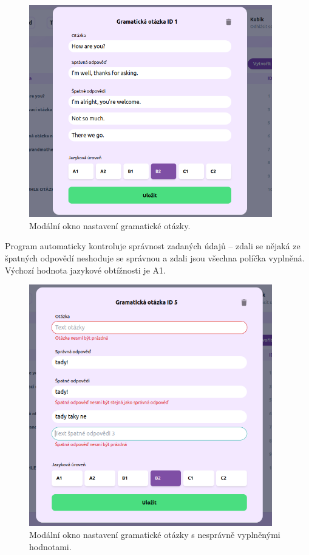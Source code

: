\begin{figure}[H]
    \centering
    \includegraphics[width=400px]{images/01design/question.png}
    \caption{Modální okno nastavení gramatické otázky.}
\end{figure}

Program automaticky kontroluje správnost zadaných údajů -- zdali se nějaká ze špatných odpovědí neshoduje se správnou a zdali jsou všechna políčka vyplněná. Výchozí hodnota jazykové obtížnosti je A1.

\begin{figure}[H]
    \centering
    \includegraphics[width=400px]{images/01design/question-bad.png}
    \caption{Modální okno nastavení gramatické otázky s nesprávně vyplněnými hodnotami.}
\end{figure}

